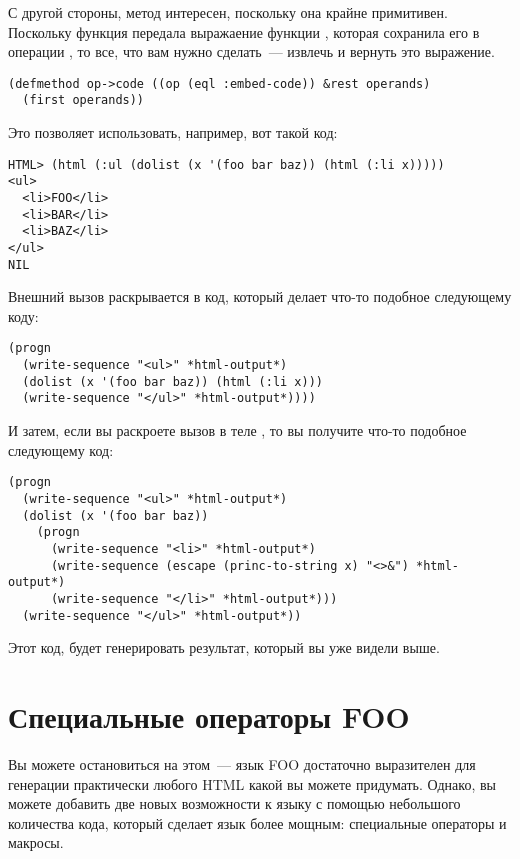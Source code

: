 С другой стороны, метод  интересен, поскольку она крайне примитивен.
Поскольку функция  передала выражаение функции , которая
сохранила его в операции , то все, что вам нужно сделать~--- извлечь и
вернуть это выражение.

\begin{lstlisting}
(defmethod op->code ((op (eql :embed-code)) &rest operands)
  (first operands))
\end{lstlisting}

Это позволяет использовать, например, вот такой код:

\begin{lstlisting}
HTML> (html (:ul (dolist (x '(foo bar baz)) (html (:li x)))))
<ul>
  <li>FOO</li>
  <li>BAR</li>
  <li>BAZ</li>
</ul>
NIL
\end{lstlisting}

Внешний вызов  раскрывается в код, который делает что-то подобное следующему коду:

\begin{lstlisting}
(progn
  (write-sequence "<ul>" *html-output*)
  (dolist (x '(foo bar baz)) (html (:li x)))
  (write-sequence "</ul>" *html-output*))))
\end{lstlisting}

И затем, если вы раскроете вызов  в теле , то вы получите что-то подобное следующему код:

\begin{lstlisting}
(progn
  (write-sequence "<ul>" *html-output*)
  (dolist (x '(foo bar baz))
    (progn
      (write-sequence "<li>" *html-output*)
      (write-sequence (escape (princ-to-string x) "<>&") *html-output*)
      (write-sequence "</li>" *html-output*)))
  (write-sequence "</ul>" *html-output*))
\end{lstlisting}

Этот код, будет генерировать результат, который вы уже видели выше.

\section{Специальные операторы FOO}

Вы можете остановиться на этом~--- язык FOO достаточно выразителен для генерации
практически любого HTML какой вы можете придумать.  Однако, вы можете добавить две новых
возможности к языку с помощью небольшого количества кода, который сделает язык более
мощным: специальные операторы и макросы.

